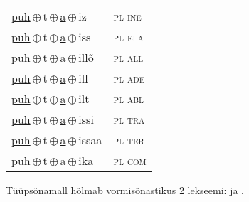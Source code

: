 \begin{minipage}{\textwidth}
\begin{sideways}
\begin{tabular}{l l}
\underline{puh}\,$\oplus$\,t\,$\oplus$\,\underline{a}\,$\oplus$\,iz & \textsc{ pl ine } \\
\underline{puh}\,$\oplus$\,t\,$\oplus$\,\underline{a}\,$\oplus$\,iss & \textsc{ pl ela } \\
\underline{puh}\,$\oplus$\,t\,$\oplus$\,\underline{a}\,$\oplus$\,illõ & \textsc{ pl all } \\
\underline{puh}\,$\oplus$\,t\,$\oplus$\,\underline{a}\,$\oplus$\,ill & \textsc{ pl ade } \\
\underline{puh}\,$\oplus$\,t\,$\oplus$\,\underline{a}\,$\oplus$\,ilt & \textsc{ pl abl } \\
\underline{puh}\,$\oplus$\,t\,$\oplus$\,\underline{a}\,$\oplus$\,issi & \textsc{ pl tra } \\
\underline{puh}\,$\oplus$\,t\,$\oplus$\,\underline{a}\,$\oplus$\,issaa & \textsc{ pl ter } \\
\underline{puh}\,$\oplus$\,t\,$\oplus$\,\underline{a}\,$\oplus$\,ika & \textsc{ pl com } \\
\end{tabular}
\end{sideways}
\label{tab:tüüpsõnamall-puhaz}

\end{minipage}

 
\vspace{1em}
\noindent Tüüpsõnamall  hõlmab vormisõnastikus 2 lekseemi:  ja .
